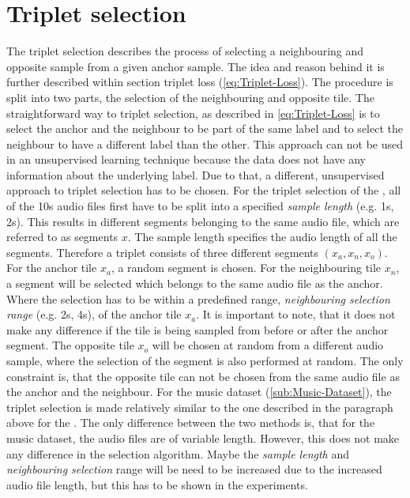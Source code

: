\section{Triplet selection}
\label{sec:Triplet-Selection}
The triplet selection describes the process of selecting a neighbouring and opposite sample from a given anchor sample. The idea and reason behind it is further described within section triplet loss (\ref{eq:Triplet-Loss}). The procedure is split into two parts, the selection of the neighbouring and opposite tile.
\newline
\newline
The straightforward way to triplet selection, as described in \ref{eq:Triplet-Loss} is to select the anchor and the neighbour to be part of the same label and to select the neighbour to have a different label than the other. This approach can not be used in an unsupervised learning technique because the data does not have any information about the underlying label. Due to that, a different, unsupervised approach to triplet selection has to be chosen.
\newline
\newline
For the triplet selection of the , all of the 10s audio files first have to be split into a specified \textit{sample length} (e.g. 1s, 2s). This results in different segments belonging to the same audio file, which are referred to as segments $x$. The sample length specifies the audio length of all the segments. Therefore a triplet consists of three different segments $(x_a, x_n, x_o)$.
\newline
For the anchor tile $x_a$, a random segment is chosen. For the neighbouring tile $x_n$, a segment will be selected which belongs to the same audio file as the anchor. Where the selection has to be within a predefined range, \textit{neighbouring selection range} (e.g. 2s, 4s), of the anchor tile $x_a$. It is important to note, that it does not make any difference if the tile is being sampled from before or after the anchor segment. The opposite tile $x_o$ will be chosen at random from a different audio sample, where the selection of the segment is also performed at random. The only constraint is, that the opposite tile can not be chosen from the same audio file as the anchor and the neighbour.
\newline
\newline
For the music dataset (\ref{sub:Music-Dataset}), the triplet selection is made relatively similar to the one described in the paragraph above for the . The only difference between the two methods is, that for the music dataset, the audio files are of variable length. However, this does not make any difference in the selection algorithm. Maybe the \textit{sample length} and \textit{neighbouring selection} range will be need to be increased due to the increased audio file length, but this has to be shown in the experiments.

